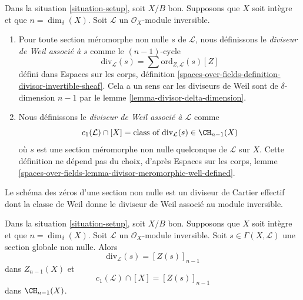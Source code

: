 \begin{definition}
\label{definition-divisor-invertible-sheaf}
Dans la situation \ref{situation-setup}, soit $X/B$ bon. Supposons que
$X$ soit intègre et que $n = \dim_\delta(X)$. Soit $\mathcal{L}$ un
$\mathcal{O}_X$-module inversible.
\begin{enumerate}
\item Pour toute section méromorphe non nulle $s$ de $\mathcal{L}$, nous
définissons le {\it diviseur de Weil associé à $s$} comme le $(n - 1)$-cycle
$$
\text{div}_\mathcal{L}(s) =
\sum \text{ord}_{Z, \mathcal{L}}(s) [Z]
$$
défini dans Espaces sur les corps, définition
\ref{spaces-over-fields-definition-divisor-invertible-sheaf}. Cela a un sens
car les diviseurs de Weil sont de $\delta$-dimension $n - 1$ par le lemme
\ref{lemma-divisor-delta-dimension}.
\item Nous définissons le {\it diviseur de Weil associé à $\mathcal{L}$} comme
$$
c_1(\mathcal{L}) \cap [X] =
\text{class of }\text{div}_\mathcal{L}(s) \in \CH_{n - 1}(X)
$$
où $s$ est une section méromorphe non nulle quelconque de $\mathcal{L}$ sur
$X$. Cette définition ne dépend pas du choix, d'après Espaces sur les corps, lemme
\ref{spaces-over-fields-lemma-divisor-meromorphic-well-defined}.
\end{enumerate}
\end{definition}

\noindent
Le schéma des zéros d'une section non nulle est un diviseur de Cartier effectif
dont la classe de Weil donne le diviseur de Weil associé au module inversible.

\begin{lemma}
\label{lemma-compute-c1}
Dans la situation \ref{situation-setup}, soit $X/B$ bon. Supposons que
$X$ soit intègre et que $n = \dim_\delta(X)$. Soit $\mathcal{L}$ un
$\mathcal{O}_X$-module inversible. Soit $s \in \Gamma(X, \mathcal{L})$ une
section globale non nulle. Alors
$$
\text{div}_\mathcal{L}(s) = [Z(s)]_{n - 1}
$$
dans $Z_{n - 1}(X)$ et
$$
c_1(\mathcal{L}) \cap [X] = [Z(s)]_{n - 1}
$$
dans $\CH_{n - 1}(X)$.
\end{lemma}

